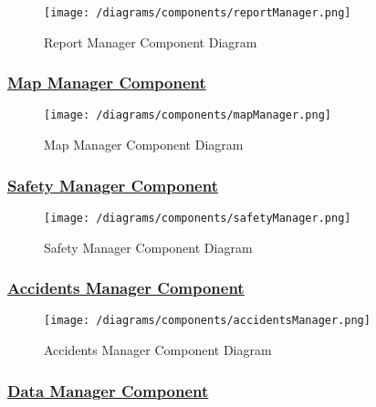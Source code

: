 			\begin{figure}[ht]
				\centering
				\texttt{[image: /diagrams/components/reportManager.png]}
				\caption{\label{fig:reportManagerComp} Report Manager Component Diagram}
			\end{figure}
		
		\subsubsection[Map Manager Component]{\hyperlink{toc}{Map Manager Component}}
			\label{sec:mapManagerComponent}
			
			\begin{figure}[ht]
				\centering
				\texttt{[image: /diagrams/components/mapManager.png]}
				\caption{\label{fig:mapManagerComp} Map Manager Component Diagram}
			\end{figure}
		
		\subsubsection[Safety Manager Component]{\hyperlink{toc}{Safety Manager Component}}
			\label{sec:safetyManagerComponent}
			
			\begin{figure}[ht]
				\centering
				\texttt{[image: /diagrams/components/safetyManager.png]}
				\caption{\label{fig:safetyManagerComp} Safety Manager Component Diagram}
			\end{figure}
		
		\subsubsection[Accidents Manager Component]{\hyperlink{toc}{Accidents Manager Component}}
			\label{sec:accidentsManagerComponent}
			
			\begin{figure}[ht]
				\centering
				\texttt{[image: /diagrams/components/accidentsManager.png]}
				\caption{\label{fig:accidentsManagerComp} Accidents Manager Component Diagram}
			\end{figure}
		
		\subsubsection[Data Manager Component]{\hyperlink{toc}{Data Manager Component}}
			\label{sec:dataManagerComponent}
			
